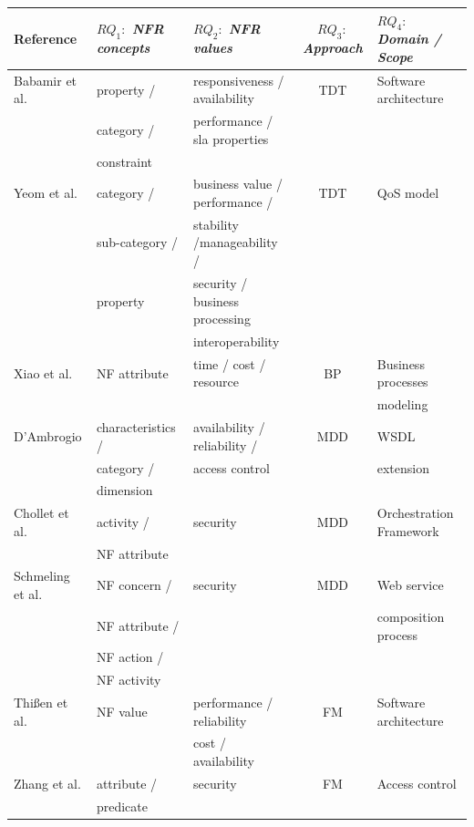   
\begin{table}[ht!]
\centering
\scriptsize
\begin{tabular}{l|l|l|c|l}
  \hline 
  \hline
   \textbf{Reference} & $RQ_1:$ \textbf{\textit{NFR concepts}} &
   $RQ_2:$ \textbf{\textit{NFR values}} & $RQ_3:$ \textbf{\textit{Approach}} &
   $RQ_4:$ \textbf{\textit{Domain / Scope}} 
   \\
  \hline
  \hline  
  Babamir et al. \cite{Babamir2010} &  property / & responsiveness /
  availability   & TDT & Software architecture
 \\  
  & category /  & performance / sla properties   &  & 
 \\
 &  constraint &    &  & 
 \\ 
  \hline   
 
  Yeom et al. \cite{Yeom2006} & category / & business value / performance /
   & TDT & QoS model\\ 
   & sub-category / & stability /manageability /   & & \\
   & property & security / business processing  & & \\
    &  & interoperability & & \\ 
  \hline 
  
  Xiao et al. \cite{XiaoCZBOLH08} &  NF attribute  & time /
cost / resource  & BP  & Business processes
   \\
 	&   &   &  & modeling
   \\   
  \hline 
  D'Ambrogio \cite{DAmbrogio06} &  characteristics /  & availability /
  reliability / & MDD & WSDL \\ &  category /  &  access control  &  &
  extension
  \\
  &  dimension &    &  & 
 \\
   \hline
  Chollet et al. \cite{CholletL09} & activity / & security  & MDD 
  & Orchestration Framework
   \\
  &  NF attribute &    &  & 
  \\
  
  \hline
  Schmeling et al. \cite{SchmelingCM11} & NF concern / & security &
  MDD &  Web service 
  \\
  & NF attribute / &  &
   & composition process
    \\
  &  NF action / &    &  &
   \\
  &  NF activity	 &    &  &
  \\ 
  \hline
    Thi{\ss}en et al. \cite{ThissenW06} & NF value  &  performance /
  reliability &  FM & Software architecture \\  
   & & cost / availability &  & \\  
  \hline
  Zhang et al. \cite{ZhangPSP05} & attribute /& security & FM &  Access control 
   \\
  &  predicate &    &  &
  \\
  

\end{tabular}
\end{table}

